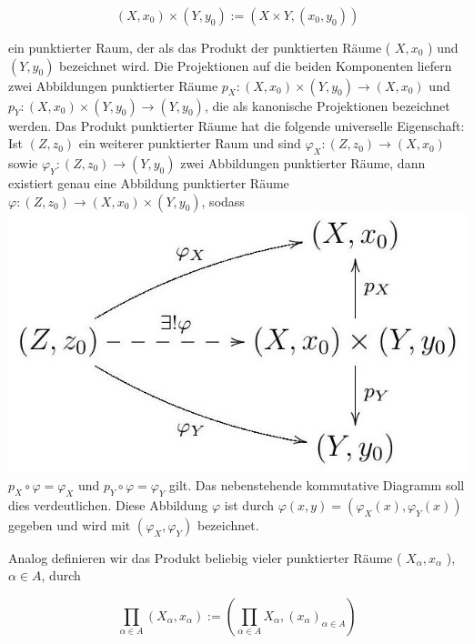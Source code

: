 \documentclass[10pt, letterpaper]{article}
\begin{document}
$$
\left(X, x_{0}\right) \times\left(Y, y_{0}\right):=\left(X \times Y,\left(x_{0}, y_{0}\right)\right)
$$

ein punktierter Raum, der als das Produkt der punktierten Räume ( $X, x_{0}$ ) und $\left(Y, y_{0}\right)$ bezeichnet wird. Die Projektionen auf die beiden Komponenten liefern zwei Abbildungen punktierter Räume $p_{X}:\left(X, x_{0}\right) \times\left(Y, y_{0}\right) \rightarrow\left(X, x_{0}\right)$ und $p_{Y}:\left(X, x_{0}\right) \times\left(Y, y_{0}\right) \rightarrow\left(Y, y_{0}\right)$, die als kanonische Projektionen bezeichnet werden. Das Produkt punktierter Räume hat die folgende universelle Eigenschaft: Ist $\left(Z, z_{0}\right)$ ein weiterer punktierter Raum und sind $\varphi_{X}:\left(Z, z_{0}\right) \rightarrow\left(X, x_{0}\right)$ sowie $\varphi_{Y}:\left(Z, z_{0}\right) \rightarrow\left(Y, y_{0}\right)$ zwei Abbildungen punktierter Räume, dann existiert genau eine Abbildung punktierter Räume $\varphi:\left(Z, z_{0}\right) \rightarrow\left(X, x_{0}\right) \times\left(Y, y_{0}\right)$, sodass\\
\includegraphics[max width=\textwidth]{2025_06_05_d7ed2bacd1e9ce1db1f0g-009} $p_{X} \circ \varphi=\varphi_{X}$ und $p_{Y} \circ \varphi=\varphi_{Y}$ gilt. Das nebenstehende kommutative Diagramm soll dies verdeutlichen. Diese Abbildung $\varphi$ ist durch $\varphi(x, y)=\left(\varphi_{X}(x), \varphi_{Y}(x)\right)$ gegeben und wird mit $\left(\varphi_{X}, \varphi_{Y}\right)$ bezeichnet.

Analog definieren wir das Produkt beliebig vieler punktierter Räume ( $X_{\alpha}, x_{\alpha}$ ), $\alpha \in A$, durch

$$
\prod_{\alpha \in A}\left(X_{\alpha}, x_{\alpha}\right):=\left(\prod_{\alpha \in A} X_{\alpha},\left(x_{\alpha}\right)_{\alpha \in A}\right)
$$
\end{document}
